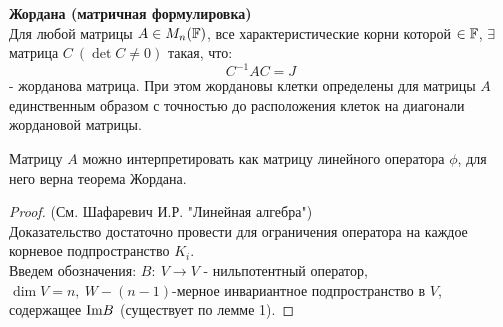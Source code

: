     \begin{theorem}\textbf{Жордана (матричная формулировка)} \\
        Для любой матрицы $A \in M_n(\mathbb{F})$, все характеристические корни которой $\in \mathbb{F}$, $\exists$ матрица $C \ (\det C \neq 0)$ такая, что: 
        $$C^{-1}AC = J$$
        - жорданова матрица. При этом жордановы клетки определены для матрицы $A$ единственным образом с точностью до расположения клеток на диагонали жордановой матрицы.  
    \end{theorem}
    \begin{remark}
        Матрицу $A$ можно интерпретировать как матрицу линейного оператора $\phi$, для него верна теорема Жордана.  
    \end{remark}
    \begin{proof} (См. Шафаревич И.Р. "Линейная алгебра")\\
        Доказательство достаточно провести для ограничения оператора на каждое корневое подпространство $K_i$.\\ 
        Введем обозначения: $B: \ V \to V$ - нильпотентный оператор, $\dim V = n, \ W - (n-1)$-мерное инвариантное подпространство в $V$, содержащее $\textup{Im}B$  (существует по лемме 1).


\end{proof}
